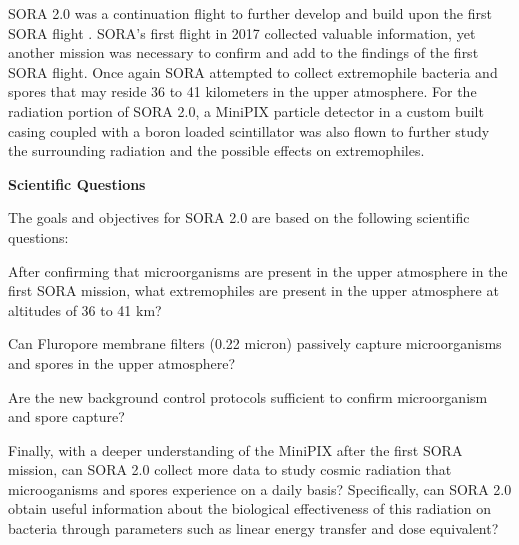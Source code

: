 SORA 2.0 was a continuation flight to further develop and build upon the first SORA flight \cite{SORA}.  SORA's first flight in 2017 collected valuable information, yet another mission was necessary to confirm and add to the findings of the first SORA flight.  Once again SORA attempted to collect extremophile bacteria and spores that may reside 36 to 41 kilometers in the upper atmosphere.  For the radiation portion of SORA 2.0, a MiniPIX particle detector in a custom built casing coupled with a boron loaded scintillator was also flown to further study the surrounding radiation and the possible effects on extremophiles.  
 
{\bf Scientific Questions}

The goals and objectives for SORA 2.0 are based on the following scientific questions: 
%
\begin{itemize}
	{\indentitem \item After confirming that microorganisms are present in the upper atmosphere in the first SORA mission, what extremophiles are present in the upper atmosphere at altitudes of 36 to 41 km?}
	{\indentitem \item Can Fluropore membrane filters (0.22 micron) passively capture microorganisms and spores in the upper atmosphere?}
	{\indentitem \item Are the new background control protocols sufficient to confirm microorganism and spore capture?} 
	{\indentitem \item Finally, with a deeper understanding of the MiniPIX after the first SORA mission, can SORA 2.0 collect more data to study cosmic radiation that microoganisms and spores experience on a daily basis? Specifically, can SORA 2.0 obtain useful information about the biological effectiveness of this radiation on bacteria through parameters such as linear energy transfer and dose equivalent?}
\end{itemize}
%


